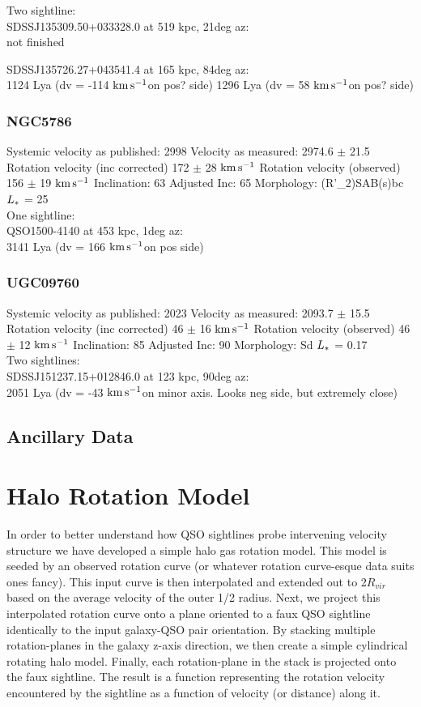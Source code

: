 \documentclass[iop]{emulateapj-rtx4}
\newcommand{\kms}{$\rm km\, s^{-1}$}
\begin{document}
Two sightline: \\
SDSSJ135309.50+033328.0 at 519 kpc, 21deg az: \\
not finished

SDSSJ135726.27+043541.4 at 165 kpc, 84deg az: \\
1124 Lya (dv = -114 \kms on pos? side)
1296 Lya (dv = 58 \kms on pos? side)



\subsubsection{NGC5786}
Systemic velocity as published: 2998
Velocity as measured: 2974.6 $\pm$ 21.5
Rotation velocity (inc corrected) 172 $\pm$ 28 \kms
Rotation velocity (observed) 156 $\pm$ 19 \kms
Inclination: 63
Adjusted Inc: 65
Morphology: (R'\_2)SAB(s)bc
$L_{\**}$ = 25 \\

One sightline: \\
QSO1500-4140 at 453 kpc, 1deg az: \\
3141 Lya (dv = 166 \kms on pos side)


\subsubsection{UGC09760}
Systemic velocity as published: 2023
Velocity as measured: 2093.7 $\pm$ 15.5
Rotation velocity (inc corrected) 46 $\pm$ 16 \kms
Rotation velocity (observed) 46 $\pm$ 12 \kms
Inclination: 85
Adjusted Inc: 90
Morphology: Sd
$L_{\**}$ = 0.17 \\

Two sightlines: \\
SDSSJ151237.15+012846.0 at 123 kpc, 90deg az: \\
2051 Lya (dv = -43 \kms on minor axis. Looks neg side, but extremely close)



\subsection{Ancillary Data}

\section{Halo Rotation Model}
In order to better understand how QSO sightlines probe intervening velocity structure we have developed a simple halo gas rotation model. This model is seeded by an observed rotation curve (or whatever rotation curve-esque data suits ones fancy). This input curve is then interpolated and extended out to 2$R_{vir}$ based on the average velocity of the outer 1/2 radius. Next, we project this interpolated rotation curve onto a plane oriented to a faux QSO sightline identically to the input galaxy-QSO pair orientation. By stacking multiple rotation-planes in the galaxy z-axis direction, we then create a simple cylindrical rotating halo model. Finally, each rotation-plane in the stack is projected onto the faux sightline. The result is a function representing the rotation velocity encountered by the sightline as a function of velocity (or distance) along it.
\end{document}

